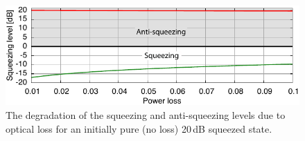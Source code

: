 \begin{figure}[!h]
\centering
\includegraphics[scale=1]{./Sec_Optics/SQZ-20dB-losschartAI.pdf}
\caption{The degradation of the squeezing and anti-squeezing levels due to optical loss for an initially pure (no loss) 20\,dB squeezed state.}
\label{fig:20dBlosschart}
\end{figure}

